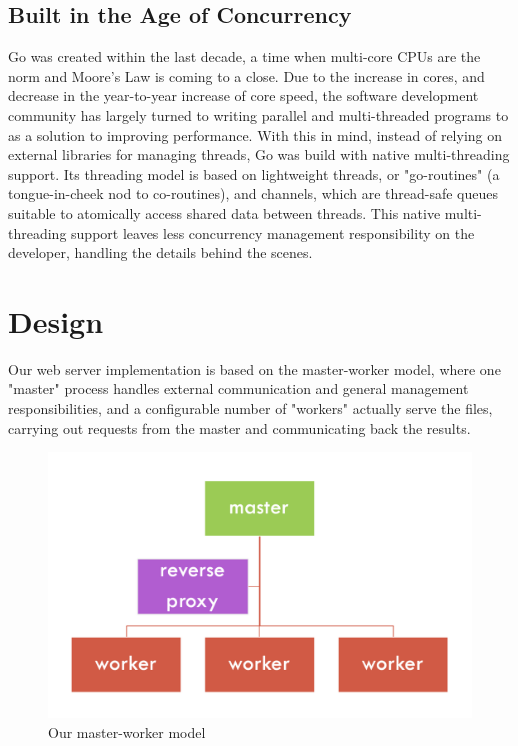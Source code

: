 \documentclass[10pt]{article}
\begin{document}
\begin{multicols}{2}
\subsection*{Built in the Age of Concurrency}
\par
Go was created within the last decade, a time when multi-core CPUs are the norm and Moore's Law is coming to a close.  Due to the increase in cores, and decrease in the year-to-year increase of core speed, the software development community has largely turned to writing parallel and multi-threaded programs to as a solution to improving performance.  With this in mind, instead of relying on external libraries for managing threads, Go was build with native multi-threading support. Its threading model is based on lightweight threads, or "go-routines" (a tongue-in-cheek nod to co-routines), and channels, which are thread-safe queues suitable to atomically access shared data between threads. This native multi-threading support leaves less concurrency management responsibility on the developer, handling the details behind the scenes.
\section*{Design}
\par
Our web server implementation is based on the master-worker model, where one "master" process handles external communication and general management responsibilities, and a configurable number of "workers" actually serve the files, carrying out requests from the master and communicating back the results.
\end{multicols}
\begin{figure}
\centering
        \includegraphics[totalheight=9cm]{./images/masterworker.png}
        \caption{Our master-worker model}
\end{figure}
\end{document}
